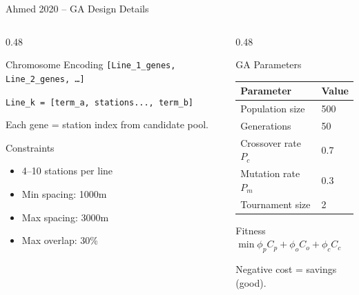 \documentclass[aspectratio=169, 11pt]{beamer}
\begin{document}
\begin{frame}{Ahmed 2020 -- GA Design Details}

\begin{columns}[T]
\begin{column}{0.48\textwidth}
\begin{block}{Chromosome Encoding}
\small
\texttt{[Line\_1\_genes, Line\_2\_genes, \ldots]}

\texttt{Line\_k = [term\_a, stations..., term\_b]}

Each gene = station index from candidate pool.
\end{block}

\begin{block}{Constraints}
\small
\begin{itemize}
    \item 4--10 stations per line
    \item Min spacing: 1000m
    \item Max spacing: 3000m
    \item Max overlap: 30\%
\end{itemize}
\end{block}
\end{column}
\begin{column}{0.48\textwidth}
\begin{block}{GA Parameters}
\small
\begin{tabular}{ll}
\toprule
\textbf{Parameter} & \textbf{Value} \\
\midrule
Population size & 500 \\
Generations & 50 \\
Crossover rate \(P_c\) & 0.7 \\
Mutation rate \(P_m\) & 0.3 \\
Tournament size & 2 \\
\bottomrule
\end{tabular}
\end{block}

\begin{block}{Fitness}
\small
\(\min \phi_p C_p + \phi_o C_o + \phi_c C_c\)

Negative cost = savings (good).
\end{block}
\end{column}
\end{columns}
\end{frame}
\end{document}
